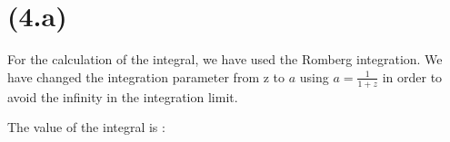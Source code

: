 \section{(4.a)}
For the calculation of the integral, we have used the Romberg integration. We have changed the integration parameter from z to $a$ using $a=\frac{1}{1+z}$ in order to avoid the infinity in the integration limit.


The value of the integral is :
